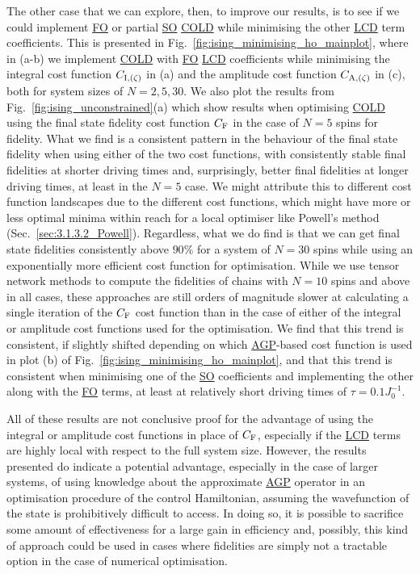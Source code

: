 \documentclass[a4paper,oneside,11pt]{book}
\newcommand{\acrref}[1]{\hyperref[acr:#1]{#1}}
\begin{document}
The other case that we can explore, then, to improve our results, is to see if we could implement \acrref{FO} or partial \acrref{SO} \acrref{COLD} while minimising the other \acrref{LCD} term coefficients. This is presented in Fig.~\ref{fig:ising_minimising_ho_mainplot}, where in (a-b) we implement \acrref{COLD} with \acrref{FO} \acrref{LCD} coefficients while minimising the integral cost function $C_{\rm I, (\zeta)}$ in (a) and the amplitude cost function $C_{\rm A, (\zeta)}$ in (c), both for system sizes of $N = 2, 5, 30$. We also plot the results from Fig.~\ref{fig:ising_unconstrained}(a) which show results when optimising \acrref{COLD} using the final state fidelity cost function $C_{\rm F}$ in the case of $N = 5$ spins for fidelity. What we find is a consistent pattern in the behaviour of the final state fidelity when using either of the two cost functions, with consistently stable final fidelities at shorter driving times and, surprisingly, better final fidelities at longer driving times, at least in the $N=5$ case. We might attribute this to different cost function landscapes due to the different cost functions, which might have more or less optimal minima within reach for a local optimiser like Powell's method (Sec.~\ref{sec:3.1.3.2_Powell}). Regardless, what we do find is that we can get final state fidelities consistently above $90\%$ for a system of $N=30$ spins while using an exponentially more efficient cost function for optimisation. While we use tensor network methods to compute the fidelities of chains with $N=10$ spins and above in all cases, these approaches are still orders of magnitude slower at calculating a single iteration of the $C_{\rm F}$ cost function than in the case of  either of the integral or amplitude cost functions used for the optimisation. We find that this trend is consistent, if slightly shifted depending on which \acrref{AGP}-based cost function is used in plot (b) of Fig.~\ref{fig:ising_minimising_ho_mainplot}, and that this trend is consistent when minimising one of the \acrref{SO} coefficients and implementing the other along with the \acrref{FO} terms, at least at relatively short driving times of $\tau = 0.1J_0^{-1}$.

All of these results are not conclusive proof for the advantage of using the integral or amplitude cost functions in place of $C_{\rm F}$, especially if the \acrref{LCD} terms are highly local with respect to the full system size. However, the results presented do indicate a potential advantage, especially in the case of larger systems, of using knowledge about the approximate \acrref{AGP} operator in an optimisation procedure of the control Hamiltonian, assuming the wavefunction of the state is prohibitively difficult to access. In doing so, it is possible to sacrifice some amount of effectiveness for a large gain in efficiency and, possibly, this kind of approach could be used in cases where fidelities are simply not a tractable option in the case of numerical optimisation.
\end{document}
